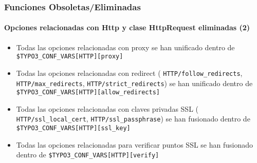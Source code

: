 \begin{frame}[fragile]
	\frametitle{Funciones Obsoletas/Eliminadas}
	\framesubtitle{Opciones relacionadas con Http y clase HttpRequest eliminadas (2)}

	\begin{itemize}

		\item Todas las opciones relacionadas con proxy se han unificado dentro de\newline
			\small\texttt{\$TYPO3\_CONF\_VARS[HTTP][proxy]}\normalsize

		\item Todas las opciones relacionadas con redirect
			(\small
				\texttt{HTTP/follow\_redirects},
				\texttt{HTTP/max\_redirects},
				\texttt{HTTP/strict\_redirects}\normalsize)
			se han unificado dentro de
			\small
				\texttt{\$TYPO3\_CONF\_VARS[HTTP][allow\_redirects]}
			\normalsize

		\item Todas las opciones relacionadas con claves privadas SSL
			(\small
				\texttt{HTTP/ssl\_local\_cert},
				\texttt{HTTP/ssl\_passphrase}\normalsize)
			se han fusionado dentro de
			\small
				\texttt{\$TYPO3\_CONF\_VARS[HTTP][ssl\_key]}
			\normalsize

		\item Todas las opciones relacionadas para verificar puntos SSL se han fusionado dentro de
			\small
				\texttt{\$TYPO3\_CONF\_VARS[HTTP][verify]}
			\normalsize

	\end{itemize}

\end{frame}


